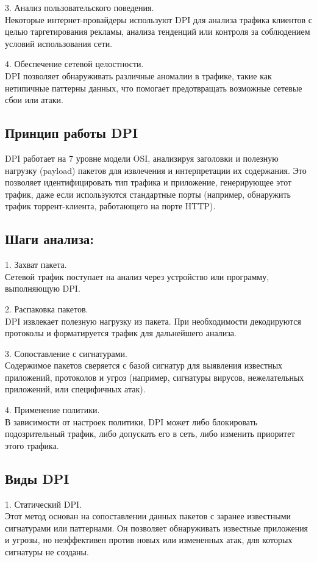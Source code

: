 \documentclass[utf8,14pt,a4paper,oneside,russian]{book}
\begin{document}
3. Анализ пользовательского поведения.\\
Некоторые интернет-провайдеры используют DPI для анализа трафика клиентов с целью таргетирования рекламы, анализа тенденций или контроля за
соблюдением условий использования сети.

4. Обеспечение сетевой целостности.\\
DPI позволяет обнаруживать различные аномалии в трафике, такие как нетипичные паттерны данных, что помогает предотвращать возможные сетевые
сбои или атаки.

\subsection{Принцип работы DPI}

DPI работает на 7 уровне модели OSI, анализируя заголовки и полезную нагрузку (payload) пакетов для извлечения и интерпретации их содержания.
Это позволяет идентифицировать тип трафика и приложение, генерирующее этот трафик, даже если используются стандартные порты (например,
обнаружить трафик торрент-клиента, работающего на порте HTTP).

\subsection{Шаги анализа:}
1. Захват пакета.\\
Сетевой трафик поступает на анализ через устройство или программу, выполняющую DPI.

2. Распаковка пакетов.\\
DPI извлекает полезную нагрузку из пакета. При необходимости декодируются протоколы и форматируется трафик для дальнейшего анализа.

3. Сопоставление с сигнатурами.\\
Содержимое пакетов сверяется с базой сигнатур для выявления известных приложений, протоколов и угроз (например, сигнатуры вирусов,
нежелательных приложений, или специфичных атак).

4. Применение политики.\\
В зависимости от настроек политики, DPI может либо блокировать подозрительный трафик, либо допускать его в сеть, либо изменить приоритет этого
трафика.

\subsection{Виды DPI}

1. Статический DPI.\\
Этот метод основан на сопоставлении данных пакетов с заранее известными сигнатурами или паттернами. Он позволяет обнаруживать известные приложения
и угрозы, но неэффективен против новых или измененных атак, для которых сигнатуры не созданы.
\end{document}
